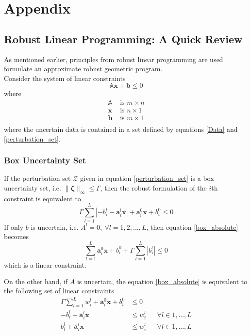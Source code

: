 \section*{Appendix}

\subsection{Robust Linear Programming: A Quick Review} \label{LP_to_GP}

As mentioned earlier, principles from robust linear programming are used
formulate an approximate robust geometric program.\\[12pt]
Consider the system of linear constraints
\begin{equation*}
    \mathbb{A}\mathbf{x} + \mathbf{b} \leq 0
\end{equation*}
where
\begin{equation*}
\begin{aligned}
\mathbb{A} &\text{ is $m \times n$}\\
\mathbf{x} &\text{ is $n \times 1$}\\
\mathbf{b} &\text{ is $m \times 1$}\\
\end{aligned}
\end{equation*}
where the uncertain data is contained in a set defined by equations \eqref{Data} and \eqref{perturbation_set}.

\subsubsection{Box Uncertainty Set}
If the perturbation set $\mathcal{Z}$ given in equation \eqref{perturbation_set} is a box
uncertainty set, i.e. $\|\mathbf{\zeta}\|_{\infty} \leq \Gamma$, then the robust formulation of the $i$th constraint is equivalent to
\begin{equation}
\Gamma \textstyle{\sum}_{l=1}^L |- {b}^l_{i} - \mathbf{a}^l_i\mathbf{x}| + \mathbf{a}^0_i\mathbf{x} + b^0_i \leq 0
\label{box_absolute}
\end{equation}
If only $b$ is uncertain, i.e. $A^l = 0,~\forall l = 1,2,...,L$, then equation \eqref{box_absolute} becomes
\begin{equation}
\textstyle{\sum}_{l=1}^L \mathbf{a}^0_{i}\mathbf{x} + b^0_{i} + \Gamma \textstyle{\sum}_{l=1}^L |b^l_{i}| \leq 0
\label{box_coeff}
\end{equation}
which is a linear constraint.

On the other hand, if $A$ is uncertain, the equation \eqref{box_absolute} is equivalent to the following set of linear constraints
\begin{equation}
\begin{aligned}
\Gamma \textstyle{\sum}_{l=1}^L w^l_{i} + \mathbf{a}^0_{i}\mathbf{x} + b^0_{i} &\leq 0\\
- b^l_{i} - \mathbf{a}^l_{i}\mathbf{x} &\leq w^l_{i} &&\forall l \in 1,...,L\\
b^l_{i} + \mathbf{a}^l_{i}\mathbf{x} &\leq w^l_{i} &&\forall l \in 1,...,L\\
\end{aligned}
\label{box_linear}
\end{equation}

